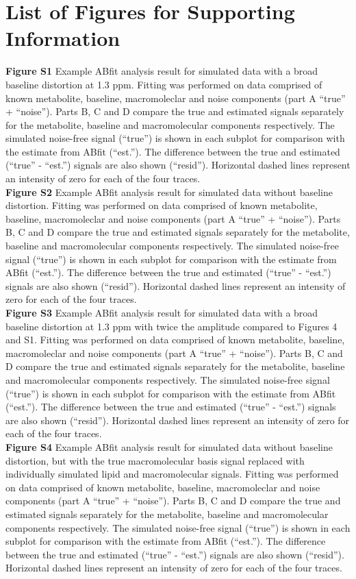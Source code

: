 \documentclass[num-refs]{wiley-article}
\begin{document}
\section*{List of Figures for Supporting Information}
\textbf{Figure S1} Example ABfit analysis result for simulated data with a broad baseline distortion at 1.3 ppm. Fitting was performed on data comprised of known metabolite, baseline, macromoleclar and noise components (part A ``true'' + ``noise''). Parts B, C and D compare the true and estimated signals separately for the metabolite, baseline and macromolecular components respectively. The simulated noise-free signal (``true'') is shown in each subplot for comparison with the estimate from ABfit (``est.''). The difference between the true and estimated (``true'' - ``est.'') signals are also shown (``resid''). Horizontal dashed lines represent an intensity of zero for each of the four traces.\\
\textbf{Figure S2} Example ABfit analysis result for simulated data without baseline distortion. Fitting was performed on data comprised of known metabolite, baseline, macromoleclar and noise components (part A ``true'' + ``noise''). Parts B, C and D compare the true and estimated signals separately for the metabolite, baseline and macromolecular components respectively. The simulated noise-free signal (``true'') is shown in each subplot for comparison with the estimate from ABfit (``est.''). The difference between the true and estimated (``true'' - ``est.'') signals are also shown (``resid''). Horizontal dashed lines represent an intensity of zero for each of the four traces.\\
\textbf{Figure S3} Example ABfit analysis result for simulated data with a broad baseline distortion at 1.3 ppm with twice the amplitude compared to Figures 4 and S1. Fitting was performed on data comprised of known metabolite, baseline, macromoleclar and noise components (part A ``true'' + ``noise''). Parts B, C and D compare the true and estimated signals separately for the metabolite, baseline and macromolecular components respectively. The simulated noise-free signal (``true'') is shown in each subplot for comparison with the estimate from ABfit (``est.''). The difference between the true and estimated (``true'' - ``est.'') signals are also shown (``resid''). Horizontal dashed lines represent an intensity of zero for each of the four traces.\\
\textbf{Figure S4} Example ABfit analysis result for simulated data without baseline distortion, but with the true macromolecular basis signal replaced with individually simulated lipid and macromolecular signals. Fitting was performed on data comprised of known metabolite, baseline, macromoleclar and noise components (part A ``true'' + ``noise''). Parts B, C and D compare the true and estimated signals separately for the metabolite, baseline and macromolecular components respectively. The simulated noise-free signal (``true'') is shown in each subplot for comparison with the estimate from ABfit (``est.''). The difference between the true and estimated (``true'' - ``est.'') signals are also shown (``resid''). Horizontal dashed lines represent an intensity of zero for each of the four traces.\\
\end{document}
